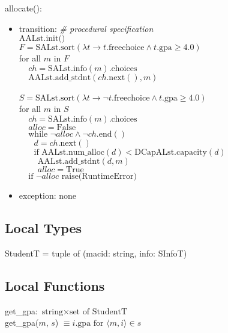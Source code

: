 \documentclass[12pt]{article}
\begin{document}
\noindent allocate():
\begin{itemize}
\item transition: \textit{\# procedural specification}\\
$\text{AALst.init()}$\\
$F = \text{SALst.sort}(\lambda t \rightarrow t.\text{freechoice} \wedge
t.\text{gpa} \geq 4.0)$\\
for all $m$ in $F$\\
$~~~~~ch = \text{SALst.info}(m).\text{choices}$\\
$~~~~~\text{AALst.add\_stdnt}(ch.\text{next}(), m)$\\
~\\
$S = \text{SALst.sort}(\lambda t \rightarrow \neg t.\text{freechoice} \wedge
t.\text{gpa} \geq 4.0)$\\
for all $m$ in $S$\\
$~~~~~ch = \text{SALst.info}(m).\text{choices}$\\
$~~~~~\mathit{alloc} = \text{False}$\\
$~~~~~\text{while } \neg \mathit{alloc} \wedge \neg ch.\text{end}()$\\
$~~~~~~~~d = ch.\text{next}()$\\
$~~~~~~~~\text{if AALst.num\_alloc}(d) < \text{DCapALst.capacity}(d)$\\
$~~~~~~~~~~\text{AALst.add\_stdnt}(d, m)$\\
$~~~~~~~~~~\mathit{alloc} = \text{True}$\\
$~~~~~\text{if } \neg \mathit{alloc} \text{ raise(RuntimeError)}$

\item exception: none
\end{itemize}

\subsection*{Local Types}

StudentT = tuple of (macid: string, info: SInfoT)

\subsection*{Local Functions}

get\_gpa: $\text{string} \times \text{set of StudentT}$\\

\noindent get\_gpa($m$, $s$) $\equiv i.\text{gpa} \text{ for } \langle m, i \rangle
\in s $\\
\end{document}
